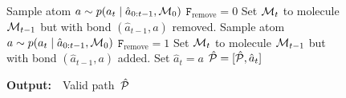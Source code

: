 \begin{wrapfigure}{R}{0.5\textwidth}
\begin{minipage}{1.\textwidth}
\begin{algorithm}[H]
\begin{algorithmic}[1]
    
    		\STATE Sample atom $a \sim p(a_t \mid \hat{a}_{0:t-1}, {\mathcal{M}}_0)$%
            	\STATE $\texttt{F}_\textrm{remove} = 0$
            \ENDIF
            \STATE Set ${\mathcal{M}}_t$ to molecule ${\mathcal{M}}_{t-1}$ but with bond $(\hat{a}_{t-1}, a)$ removed.
        \ELSE
        	\STATE Sample atom $a \sim p(a_t \mid \hat{a}_{0:t-1}, {\mathcal{M}}_0)$
            	\STATE $\texttt{F}_\textrm{remove} = 1$
            \ENDIF
            \STATE Set ${\mathcal{M}}_t$ to molecule ${\mathcal{M}}_{t-1}$ but with bond $(\hat{a}_{t-1}, a)$ added.
   		\ENDIF
        \STATE Set $\hat{a}_t = a$
        \STATE $\hat{{\mathcal{P}}} = [\hat{{\mathcal{P}}}, \hat{a}_t]$
    \ENDFOR
  \end{algorithmic}
  {\bf Output:}~~Valid path~$\hat{{\mathcal{P}}}$
  \label{algo:valid_path}
\end{algorithm}
\end{minipage}
\end{wrapfigure}